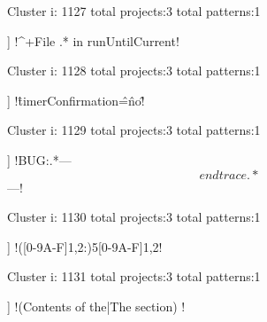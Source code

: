 Cluster i: 1127
total projects:3
total patterns:1
\begin{multicols}{1}
\begin{description}[noitemsep,topsep=0pt]
\item [[3] ] \cverb!^\s+File .* in runUntilCurrent!
\end{description}
\end{multicols}







Cluster i: 1128
total projects:3
total patterns:1
\begin{multicols}{1}
\begin{description}[noitemsep,topsep=0pt]
\item [[3] ] \cverb!\^timerConfirmation\^=\^no\^!
\end{description}
\end{multicols}







Cluster i: 1129
total projects:3
total patterns:1
\begin{multicols}{1}
\begin{description}[noitemsep,topsep=0pt]
\item [[3] ] \cverb!BUG:.*---\[ end trace .* \]---!
\end{description}
\end{multicols}







Cluster i: 1130
total projects:3
total patterns:1
\begin{multicols}{1}
\begin{description}[noitemsep,topsep=0pt]
\item [[3] ] \cverb!([0-9A-F]{1,2}:){5}[0-9A-F]{1,2}!
\end{description}
\end{multicols}







Cluster i: 1131
total projects:3
total patterns:1
\begin{multicols}{1}
\begin{description}[noitemsep,topsep=0pt]
\item [[3] ] \cverb!\n(Contents of the|The section) !
\end{description}
\end{multicols}







